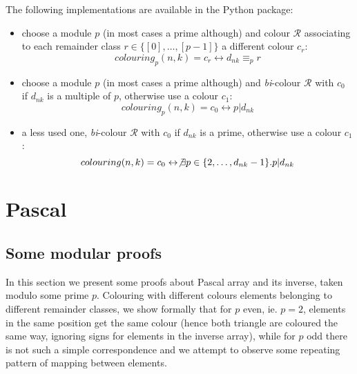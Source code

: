\documentclass[11pt,a4paper]{article} %
\begin{document}
    The following implementations are available in the Python package:
    \begin{itemize}
        \item choose a module $p$ (in most cases a prime although) and
            colour $\mathcal{R}$ associating to each remainder class 
            $r \in \lbrace[0],\ldots,[p-1]\rbrace$
            a different colour $c_r$:
            \begin{displaymath}
                colouring_{p}(n,k) = c_{r} \leftrightarrow d_{nk} \equiv_{p} r
            \end{displaymath}
        \item choose a module $p$ (in most cases a prime although) and
            \emph{bi}-colour $\mathcal{R}$ with $c_0$ if $d_{nk}$ 
            is a multiple of $p$, otherwise use a colour $c_1$:
            \begin{displaymath}
                colouring_{p}(n,k) = c_{0} \leftrightarrow p | d_{nk}
            \end{displaymath}
        \item a less used one, \emph{bi}-colour $\mathcal{R}$ with $c_0$ 
            if $d_{nk}$ is a prime, otherwise use a colour $c_1$:
            \begin{displaymath}
                colouring(n,k) = c_{0} \leftrightarrow \not 
                    \exists p\in\lbrace 2,\ldots,d_{nk}-1\rbrace.p|d_{nk} 
            \end{displaymath}
    \end{itemize}

    \section{Pascal}

    \subsection{Some modular proofs}
    
    In this section we present some proofs about Pascal array and its
    inverse, taken modulo some prime $p$. Colouring with different
    colours elements belonging to different remainder classes, we show
    formally that for $p$ even, ie. $p=2$, elements in the same
    position get the same colour (hence both triangle are coloured the
    same way, ignoring signs for elements in the inverse array), while
    for $p$ odd there is not such a simple correspondence and we
    attempt to observe some repeating pattern of mapping between
    elements.
\end{document}
